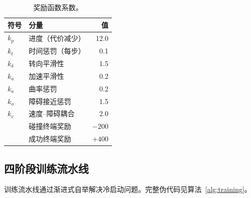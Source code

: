 \documentclass[conference]{IEEEtran}
\begin{document}
\begin{table}[t]
\centering
\caption{奖励函数系数。}
\label{tab:reward_coeff}
\footnotesize
\begin{tabular}{@{}llr@{}}
\toprule
\textbf{符号} & \textbf{分量} & \textbf{值} \\
\midrule
$k_p$ & 进度（代价减少）     & 12.0 \\
$k_t$ & 时间惩罚（每步）     & 0.1 \\
$k_\delta$ & 转向平滑性      & 1.5 \\
$k_a$ & 加速平滑性          & 0.2 \\
$k_\kappa$ & 曲率惩罚        & 0.2 \\
$k_o$ & 障碍接近惩罚        & 1.5 \\
$k_v$ & 速度--障碍耦合      & 2.0 \\
\midrule
& 碰撞终端奖励            & $-200$ \\
& 成功终端奖励            & $+400$ \\
\bottomrule
\end{tabular}
\end{table}

\subsection{四阶段训练流水线}\label{sec:pipeline}

训练流水线通过渐进式自举解决冷启动问题。完整伪代码见算法~\ref{alg:training}。
\end{document}
